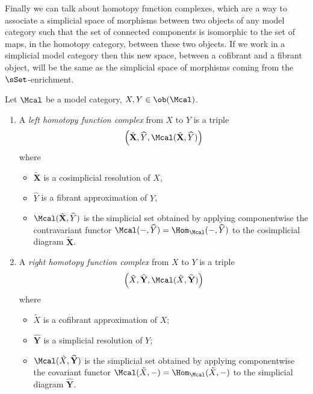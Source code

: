         Finally we can talk about homotopy function complexes, which are a way to associate a simplicial space of morphisms between two objects of any model category  such that the set of connected components is isomorphic to the set of maps, in the homotopy category, between these two objects. If we work in a simplicial model category then this new space, between a cofibrant and a fibrant object, will be the same as the simplicial space of morphisms coming from the $\sSet$-enrichment.

        \begin{defn}
            \label{defn:homotopy_function_complexes}
            Let $\Mcal$ be a model category, $X, Y \in \ob(\Mcal)$. 
            \begin{enumerate}
                \item A \emph{left homotopy function complex} from $X$ to $Y$ is a triple \[\left(\tilde{\mathbf{X}}, \widehat{Y}, \Mcal(\tilde{\mathbf{X}}, \widehat{Y})\right) \] where 
                \begin{itemize}
                    \item $\tilde{\mathbf{X}}$ is a cosimplicial resolution of $X$,
                    \item $\widehat{Y}$ is a fibrant approximation of $Y$,
                    \item $\Mcal(\tilde{\mathbf{X}}, \widehat{Y})$ is the simplicial set obtained by applying componentwise the contravariant functor $\Mcal(-, \widehat{Y}) = \Hom_{\Mcal}(-, \widehat{Y})$ to the cosimplicial diagram $\tilde{\mathbf{X}}$.
                \end{itemize}
                \item A \emph{right homotopy function complex} from $X$ to $Y$ is a triple \[\left(\tilde{X}, \widehat{\mathbf{Y}}, \Mcal(\tilde{X}, \widehat{\mathbf{Y}})\right) \] where 
                \begin{itemize}
                    \item $\tilde{X}$ is a cofibrant approximation of $X$;
                    \item $\widehat{\mathbf{Y}}$ is a simplicial resolution of $Y$;
                    \item $\Mcal(\tilde{X}, \widehat{\mathbf{Y}})$ is the simplicial set obtained by applying componentwise the covariant functor $\Mcal(\tilde{X}, -) = \Hom_{\Mcal}(\tilde{X}, -)$ to the simplicial diagram $\widehat{\mathbf{Y}}$.
                \end{itemize}


\end{enumerate}
\end{defn}
